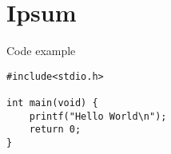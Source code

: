 \chapter{Ipsum}

\begin{listing}[!ht]
\caption{Code example}
\label{lst:example}
\begin{verbatim}
#include<stdio.h>

int main(void) {
	printf("Hello World\n");
	return 0;
}
\end{verbatim}
\end{listing}
